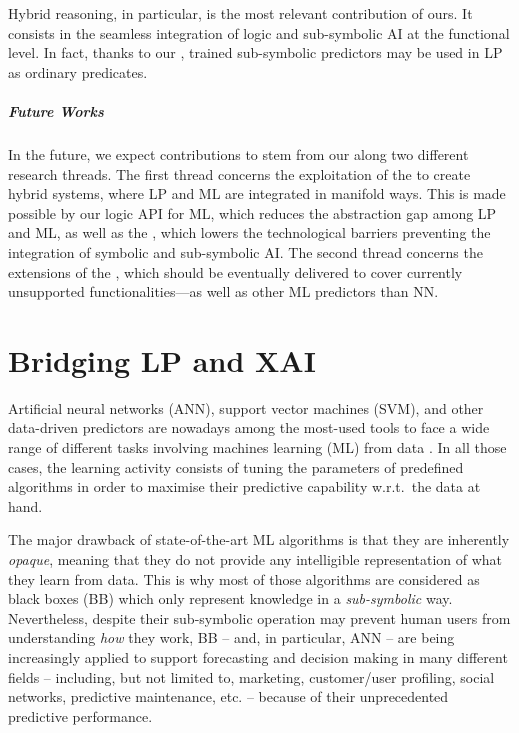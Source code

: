 \documentclass[12pt,a4paper,openright,twoside]{book}
\begin{document}
Hybrid reasoning, in particular, is the most relevant contribution of ours.
%
It consists in the seamless integration of logic and sub-symbolic AI at the functional level.
%
In fact, thanks to our \mllib{}, trained sub-symbolic predictors may be used in LP as ordinary predicates.

\paragraph{Future Works}

In the future, we expect contributions to stem from our \mllib{} along two different research threads.
%
The first thread concerns the exploitation of the \mllib{} to create hybrid systems, where LP and ML are integrated in manifold ways.
%
This is made possible by our logic API for ML, which reduces the abstraction gap among LP and ML, as well as the \mllib, which lowers the technological barriers preventing the integration of symbolic and sub-symbolic AI.
%
The second thread concerns the extensions of the \mllib{}, which should be eventually delivered to cover currently unsupported functionalities---as well as other ML predictors than NN.

\chapter{Bridging LP and XAI}
\label{chap:psyke}


Artificial neural networks (ANN), support vector machines (SVM), and other data-driven predictors are nowadays among the most-used tools to face a wide range of different tasks involving machines learning (ML) from data \cite{rocha2012far}.
%
In all those cases, the learning activity consists of tuning the parameters of predefined algorithms in order to maximise their predictive capability w.r.t.\ the data at hand.

The major drawback of state-of-the-art ML algorithms is that they are inherently \emph{opaque}, meaning that they do not provide any intelligible representation of what they learn from data.
%
This is why most of those algorithms are considered as black boxes (BB) which only represent knowledge in a \emph{sub-symbolic} way.
%
Nevertheless, despite their sub-symbolic operation may prevent human users from understanding \emph{how} they work, BB -- and, in particular, ANN -- are being increasingly applied to support forecasting and decision making in many different fields -- including, but not limited to, marketing, customer/user profiling, social networks, predictive maintenance, etc. -- because of their unprecedented predictive performance.
\end{document}
